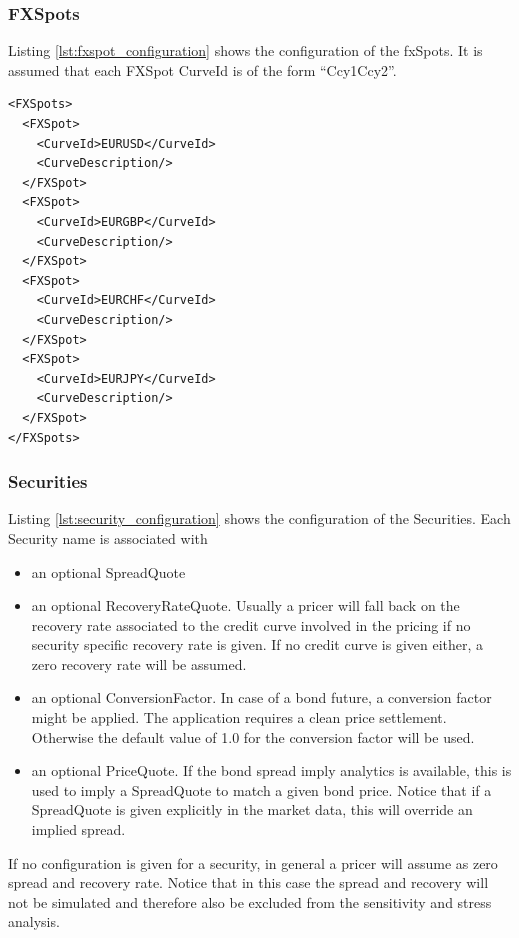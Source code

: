 

\subsubsection{FXSpots}

Listing \ref{lst:fxspot_configuration} shows the configuration of the fxSpots. It is assumed that each FXSpot CurveId is of
the form ``Ccy1Ccy2''.
\begin{longlisting}
\begin{verbatim}
<FXSpots>
  <FXSpot>
    <CurveId>EURUSD</CurveId>
    <CurveDescription/>
  </FXSpot>
  <FXSpot>
    <CurveId>EURGBP</CurveId>
    <CurveDescription/>
  </FXSpot>
  <FXSpot>
    <CurveId>EURCHF</CurveId>
    <CurveDescription/>
  </FXSpot>
  <FXSpot>
    <CurveId>EURJPY</CurveId>
    <CurveDescription/>
  </FXSpot>
</FXSpots>
\end{verbatim}
\caption{FXSpot Configuration}
\label{lst:fxspot_configuration}
\end{longlisting}

\subsubsection{Securities}

Listing \ref{lst:security_configuration} shows the configuration of the Securities. Each Security name is associated with

\begin{itemize}
\item an optional SpreadQuote
\item an optional RecoveryRateQuote. Usually a pricer will fall back on the recovery rate associated to the credit curve
  involved in the pricing if no security specific recovery rate is given. If no credit curve is given either, a zero
  recovery rate will be assumed.
\item an optional ConversionFactor. In case of a bond future, a conversion factor might be applied. The application requires
  a clean price settlement. Otherwise the default value of 1.0 for the conversion factor will be used.
\item an optional PriceQuote. If the bond spread imply analytics is available, this is used to imply a SpreadQuote to
  match a given bond price. Notice that if a SpreadQuote is given explicitly in the market data, this will override an
  implied spread.
\end{itemize}

If no configuration is given for a security, in general a pricer will assume as zero spread and recovery rate. Notice
that in this case the spread and recovery will not be simulated and therefore also be excluded from the sensitivity and
stress analysis.

